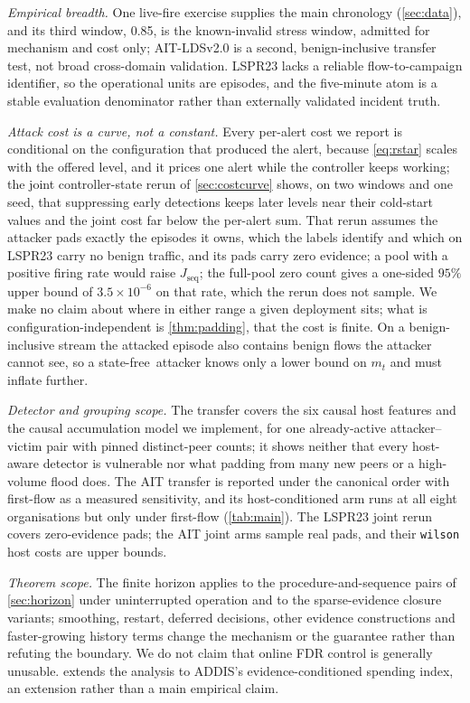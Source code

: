 \documentclass[conference]{IEEEtran}
\newcommand{\statefree}{state\nobreakdash-free}
\begin{document}
\emph{Empirical breadth.} One live-fire exercise supplies the main chronology (\cref{sec:data}), and
its third window, 0.85, is the known-invalid stress window, admitted for mechanism and cost only;
AIT-LDSv2.0 is a second, benign-inclusive transfer test, not broad cross-domain validation. LSPR23
lacks a reliable flow-to-campaign identifier, so the operational units are episodes, and the five-minute
atom is a stable evaluation denominator rather than externally validated incident truth.

\emph{Attack cost is a curve, not a constant.} Every per-alert cost we report is conditional on the
configuration that produced the alert, because \eqref{eq:rstar} scales with the offered level, and it
prices one alert while the controller keeps working; the joint controller-state rerun of
\cref{sec:costcurve} shows, on two windows and one seed, that suppressing early detections keeps later
levels near their cold-start values and the joint cost far below the per-alert sum. That rerun
assumes the attacker pads exactly the episodes it owns, which the labels identify and which on LSPR23
carry no benign traffic, and its pads carry zero evidence; a pool with a positive firing rate would
raise $J_{\mathrm{seq}}$; the full-pool zero count gives a one-sided $95\%$ upper bound of
$3.5\times10^{-6}$ on that rate, which the rerun does not sample. We make no claim about where in either range a given deployment sits; what is configuration-independent is
\cref{thm:padding}, that the cost is finite. On a benign-inclusive stream the attacked episode also
contains benign flows the attacker cannot see, so a \statefree\ attacker knows only a lower bound on
$m_t$ and must inflate further.

\emph{Detector and grouping scope.} The transfer covers the six causal host features and the causal
accumulation model we implement, for one already-active attacker--victim pair with pinned distinct-peer
counts; it shows neither that every host-aware detector is vulnerable nor what padding from many new
peers or a high-volume flood does. The AIT transfer is reported under the
canonical order with first-flow as a measured sensitivity, and its host-conditioned arm runs at all
eight organisations but only under first-flow (\cref{tab:main}). The LSPR23 joint rerun covers zero\nobreakdash-evidence pads; the AIT
joint arms sample real pads, and their \texttt{wilson} host costs are upper bounds.

\emph{Theorem scope.} The finite horizon applies to the procedure-and-sequence pairs of
\cref{sec:horizon} under uninterrupted operation and to the sparse-evidence closure variants; smoothing,
restart, deferred decisions, other evidence constructions and faster-growing history terms change the
mechanism or the guarantee rather than refuting the boundary. We do not claim that online FDR control is generally unusable. \label{sec:stateptr}
extends the analysis to ADDIS's evidence-conditioned spending index, an extension rather than a main
empirical claim.
\end{document}
